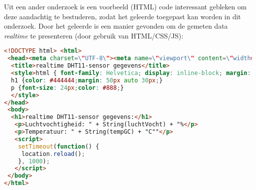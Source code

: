 Uit een ander onderzoek \cite{electronicshub} is een voorbeeld (HTML) code interessant gebleken om deze aandachtig te bestuderen, zodat het geleerde toegepast kan worden in dit onderzoek. 
Door het geleerde is een manier gevonden om de gemeten data \textit{realtime} te presenteren (door gebruik van HTML/CSS/JS):
\begin{lstlisting}[language=HTML]
<!DOCTYPE html> <html>
 <head><meta charset=\"UTF-8\"><meta name=\"viewport\" content=\"width=device-width, initial-scale=1.0, user-scalable=no\">
  <title>realtime DHT11-sensor gegevens</title>
  <style>html { font-family: Helvetica; display: inline-block; margin: 0px auto; text-align: center;}
  h1 {color: #444444;margin: 50px auto 30px;}
  p {font-size: 24px;color: #888;}
  </style>
</head>
 <body>
  <h1>realtime DHT11-sensor gegevens:</h1>
   <p>Luchtvochtigheid: " + String(luchtVocht) + "%</p>
   <p>Temperatuur: " + String(tempGC) + "C""</p>
   <script>
    setTimeout(function() {
     location.reload(); 
    }, 1000);
   </script>
 </body>
</html>
\end{lstlisting}
